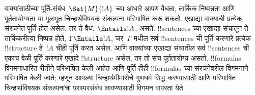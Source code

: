 \documentclass[../../../include/open-logic-section]{subfiles}
\begin{document}
वाक्यांसाठीच्या पूर्ति-संबंध~$\Sat{M}{!A}$ च्या आधारे आपण वैधता,
तार्किक निष्पन्नता आणि पूर्ततायोग्यता या मूलभूत चिन्हार्थविषयक संकल्पना
परिभाषित करू शकतो. एखाद्या वाक्याची प्रत्येक संरचनेत पूर्ति
होत असेल, तर ते वैध, $\Entails !A$, असते. !!{sentence}s च्या एखाद्या
संचातून ते तार्किकरीत्या निष्पन्न होते, $\Gamma \Entails !A$, जर~$\Gamma$ मधील
सर्व !!{sentence}s ची पूर्ति करणारे प्रत्येक !!{structure} हे~$!A$ चीही
पूर्ति करत असेल. आणि वाक्यांच्या एखाद्या संचातील सर्व
!!{sentence}s ची एकाच वेळी पूर्ति करणारे एखादे !!{structure} असेल, तर तो
संच पूर्ततायोग्य असतो. !!{formula}s विगमनाधारित रीतीने परिभाषित केली आहेत
आणि पूर्ति हीही !!{formula}s च्या संरचनेवरील विगमनाने परिभाषित केली जाते;
म्हणून आपल्या चिन्हार्थमीमांसेचे गुणधर्म सिद्ध करण्यासाठी आणि परिभाषित
चिन्हार्थविषयक संकल्पनांचा परस्परसंबंध लावण्यासाठी विगमन वापरता येते.
\end{document}
